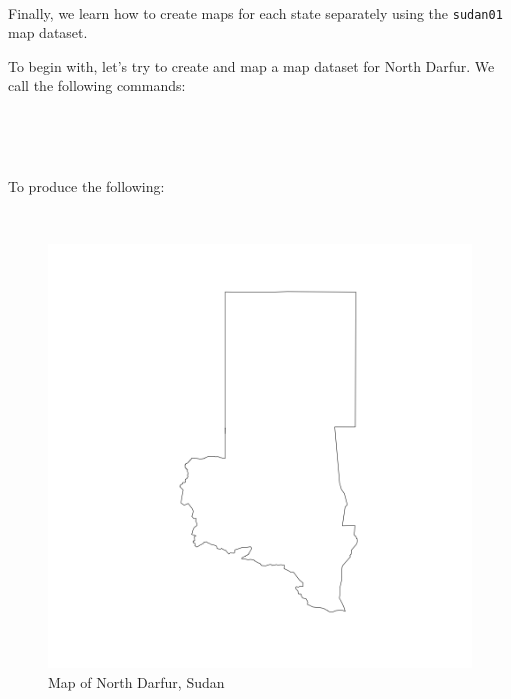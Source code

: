 \documentclass[12pt,a4paper,a4paper]{book}
\newenvironment{Shaded}{\begin{snugshade}}{\end{snugshade}}
\newcommand{\KeywordTok}[1]{\textcolor[rgb]{0.13,0.29,0.53}{\textbf{#1}}}
\newcommand{\StringTok}[1]{\textcolor[rgb]{0.31,0.60,0.02}{#1}}
\newcommand{\OperatorTok}[1]{\textcolor[rgb]{0.81,0.36,0.00}{\textbf{#1}}}
\newcommand{\NormalTok}[1]{#1}
\theoremstyle{definition}
\theoremstyle{definition}
\theoremstyle{definition}
\theoremstyle{remark}
\begin{document}
~

Finally, we learn how to create maps for each state separately using the
\texttt{sudan01} map dataset.

To begin with, let's try to create and map a map dataset for North
Darfur. We call the following commands:

~

\begin{Shaded}
\end{Shaded}

~

To produce the following:

~

\begin{figure}[H]

{\centering \includegraphics{figures/map12-1} 

}

\caption{Map of North Darfur, Sudan}\label{fig:map12}
\end{figure}
\end{document}

